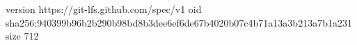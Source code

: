 version https://git-lfs.github.com/spec/v1
oid sha256:940399b96b2b290b98bd8b3dee6ef6de67b4020b07c4b71a13a3b213a7b1a231
size 712
